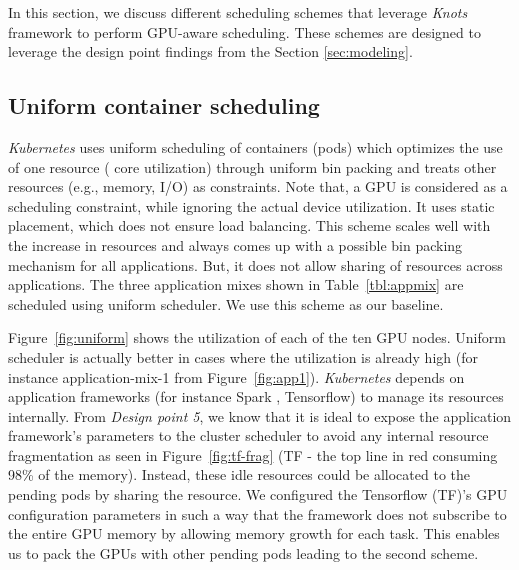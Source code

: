 In this section, we discuss different scheduling schemes that leverage \textit{Knots} framework to perform GPU-aware scheduling. These schemes are designed to leverage the design point findings from the Section \ref{sec:modeling}. 





\subsection{Uniform container scheduling}
\textit{Kubernetes} uses uniform scheduling of containers (pods) which optimizes the use of one resource ( core utilization) through uniform bin packing and treats other resources (e.g., memory, I/O) as constraints. Note that, a GPU is considered as a scheduling constraint, while ignoring the actual device utilization. It uses static placement, which does not ensure load balancing. This scheme scales well with the increase in resources and always comes up with a possible bin packing mechanism for all applications. But, it does not allow sharing of resources across applications. The three application mixes shown in Table~\ref{tbl:appmix} are scheduled using uniform scheduler. We use this scheme as our baseline.

Figure~\ref{fig:uniform} shows the utilization of each of the ten GPU nodes. Uniform scheduler is actually better in cases where the utilization is already high (for instance application-mix-1 from Figure~\ref{fig:app1}). \textit{Kubernetes} depends on application frameworks (for instance Spark \cite{spark}, Tensorflow) to manage its resources internally. From \textit{Design point 5}, we know that it is ideal to expose the application framework's parameters to the cluster scheduler to avoid any internal resource fragmentation as seen in Figure~\ref{fig:tf-frag} (TF - the top line in red consuming 98\% of the memory). Instead, these idle resources could be allocated to the pending pods by sharing the resource. We configured the Tensorflow (TF)'s GPU configuration parameters in such a way that the framework does not subscribe to the entire GPU memory by allowing memory growth for each task. This enables us to pack the GPUs with other pending pods leading to the second scheme.

